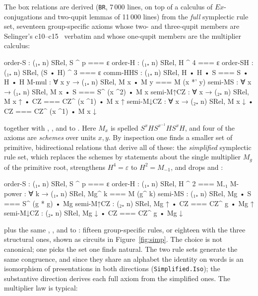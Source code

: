 The box relations are derived (\texttt{BR}, 7\,000 lines, on top of a
calculus of $\mathit{Ex}$-conjugations and two-qupit lemmas of 11\,000
lines) from the \emph{full} symplectic rule set, seventeen group-specific
axioms whose two- and three-qupit members are Selinger's
c10--c15~\cite{selinger2015clifford} verbatim and whose one-qupit
members are the multiplier calculus:

\begin{agdacode}
order-S    : (₁₊ n) SRel,  S ^ p === ε
order-H    : (₁₊ n) SRel,  H ^ 4 === ε
order-SH   : (₁₊ n) SRel,  (S • H) ^ 3 === ε
comm-HHS   : (₁₊ n) SRel,  H • H • S === S • H • H
M-mul      : ∀ x y → (₁₊ n) SRel,  M x • M y === M (x *' y)
semi-MS    : ∀ x →   (₁₊ n) SRel,  M x • S === S^ (x ^2) • M x
semi-M↑CZ  : ∀ x →   (₂₊ n) SRel,  M x ↑ • CZ === CZ^ (x ^1) • M x ↑
semi-M↓CZ  : ∀ x →   (₂₊ n) SRel,  M x ↓ • CZ === CZ^ (x ^1) • M x ↓
\end{agdacode}

together with , ,  and
 to .  Here $M_x$ is spelled
$S^{x}HS^{x^{-1}}HS^{x}H$, and four of the axioms are \emph{schemes}
over units $x, y$.  By inspection one finds a smaller set of primitive,
bidirectional relations that derive all of these: the \emph{simplified}
symplectic rule set, which replaces the schemes by statements about the
single multiplier $M_g$ of the primitive root, strengthens $H^4 =
\varepsilon$ to $H^2 = M_{-1}$, and drops  and
:

\begin{agdacode}
order-S :           (₁₊ n) SRel,  S ^ p === ε
order-H :           (₁₊ n) SRel,  H ^ 2 === M₋₁
M-power :     ∀ k → (₁₊ n) SRel,  Mg^ k === M (g^ k)
semi-MS :           (₁₊ n) SRel,  Mg • S === S^ (g * g) • Mg
semi-M↑CZ :         (₂₊ n) SRel,  Mg ↑ • CZ === CZ^ g • Mg ↑
semi-M↓CZ :         (₂₊ n) SRel,  Mg ↓ • CZ === CZ^ g • Mg ↓
\end{agdacode}

plus the same , ,  and
 to : fifteen group-specific rules, or
eighteen with the three structural ones, shown as circuits in
Figure~\ref{fig:simp}.  The choice is not canonical; one picks the set
one finds natural.  The two rule sets generate the same congruence, and
since they share an alphabet the identity on words is an isomorphism of
presentations in both directions (\texttt{Simplified.Iso}); the
substantive direction derives each full axiom from the simplified ones.
The multiplier law is typical:

